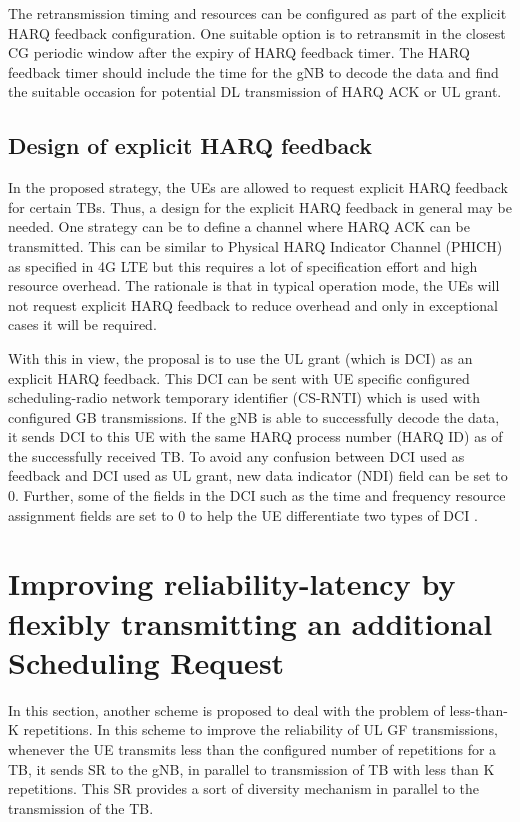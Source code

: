 \documentclass[conference]{IEEEtran}
\begin{document}
The retransmission timing and resources can be configured as part of the explicit HARQ feedback configuration. One suitable option is to retransmit in the closest CG periodic window after the expiry of HARQ feedback timer. The HARQ feedback timer should include the time for the gNB to decode the data and find the suitable occasion for potential DL transmission of HARQ ACK or UL grant.

\subsection{Design of explicit HARQ feedback}\label{IIBB}

In the proposed strategy, the UEs are allowed to request explicit HARQ feedback for certain TBs. Thus, a design for the explicit HARQ feedback in general may be needed. One strategy can be to define a channel where HARQ ACK can be transmitted. This can be similar to Physical HARQ Indicator Channel (PHICH) as specified in 4G LTE but this requires a lot of specification effort and high resource overhead. The rationale is that in typical operation mode, the UEs will not request explicit HARQ feedback to reduce overhead and only in exceptional cases it will be required. 

With this in view, the proposal is to use the UL grant (which is DCI) as an explicit HARQ feedback. This DCI can be sent with UE specific configured scheduling-radio network temporary identifier (CS-RNTI) which is used with configured GB transmissions. If the gNB is able to successfully decode the data, it sends DCI to this UE with the same HARQ process number (HARQ ID) as of the successfully received TB. To avoid any confusion between DCI used as feedback and DCI used as UL grant, new data indicator (NDI) field can be set to 0. Further, some of the fields in the DCI such as the time and frequency resource assignment fields are set to 0 to help the UE differentiate two types of DCI .

\section{Improving reliability-latency by flexibly transmitting an additional Scheduling Request }\label{III}

In this section, another scheme is proposed to deal with the problem of less-than-K repetitions. In this scheme to improve the reliability of UL GF transmissions, whenever the UE transmits less than the configured number of repetitions for a TB, it sends SR to the gNB, in parallel to transmission of TB with less than K repetitions. This SR provides a sort of diversity mechanism in parallel to the transmission of the TB.
\end{document}
